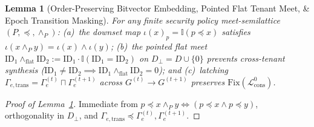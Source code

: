 \documentclass[11pt,letterpaper]{article}
\theoremstyle{spectralthm}
\newtheorem{lemma}[theorem]{Lemma}
\begin{document}
\begin{lemma}[Order-Preserving Bitvector Embedding, Pointed Flat Tenant Meet, \& Epoch Transition Masking]
\label{lem:embedding}
For any finite security policy meet-semilattice $(P, \preceq, \wedge_P)$: (a)~the downset map $\iota(x)_p = \mathbb{I}(p \preceq x)$ satisfies $\iota(x \wedge_P y) = \iota(x) \wedge \iota(y)$; (b)~the pointed flat meet $\mathrm{ID}_1 \wedge_{\mathrm{flat}} \mathrm{ID}_2 := \mathrm{ID}_1 \cdot \mathbb{I}(\mathrm{ID}_1 = \mathrm{ID}_2)$ on $D_\perp = D \cup \{0\}$ prevents cross-tenant synthesis ($\mathrm{ID}_1 \neq \mathrm{ID}_2 \implies \mathrm{ID}_1 \wedge_{\mathrm{flat}} \mathrm{ID}_2 = 0$); and (c)~latching $\Gamma_{e,\mathrm{trans}} = \Gamma_e^{(t)} \sqcap \Gamma_e^{(t+1)}$ across $G^{(t)} \rightarrow G^{(t+1)}$ preserves $\mathrm{Fix}(\mathcal{L}_{\mathrm{cons}}^0)$.
\end{lemma}
\begin{proof}[Proof of Lemma~\ref{lem:embedding}]
Immediate from $p \preceq x \wedge_P y \iff (p \preceq x \wedge p \preceq y)$, orthogonality in $D_\perp$, and $\Gamma_{e,\mathrm{trans}} \preceq \Gamma_e^{(t)}, \Gamma_e^{(t+1)}$.
\end{proof}
\end{document}
